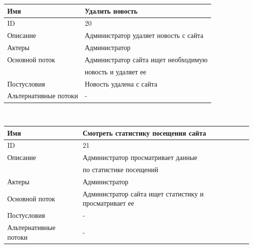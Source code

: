 \begin{center}
    \begin{tabular}{|l|l|}
        \hline
        Имя                   & Удалить новость                       \\
        \hline
        ID                    & 20                                    \\
        \hline
        Описание              & Администратор удаляет новость с сайта \\
        \hline
        Актеры                & Администратор                         \\
        \hline
        Основной поток        & Администратор сайта ищет необходимую  \\
        & новость и удаляет ее                  \\
        \hline
        Постусловия           & Новость удалена с сайта               \\
        \hline
        Альтернативные потоки & -                                     \\
        \hline
    \end{tabular}\\
    \vspace{0.8cm}
    \begin{tabular}{|l|l|}
        \hline
        Имя                   & Смотреть статистику посещения сайта                    \\
        \hline
        ID                    & 21                                                     \\
        \hline
        Описание              & Администратор просматривает данные                     \\
        & по статистике посещений                                \\
        \hline
        Актеры                & Администратор                                          \\
        \hline
        Основной поток        & Администратор сайта ищет статистику и просматривает ее \\
        \hline
        Постусловия           & -                                                      \\
        \hline
        Альтернативные потоки & -                                                      \\
        \hline
    \end{tabular}\\
\end{center}
